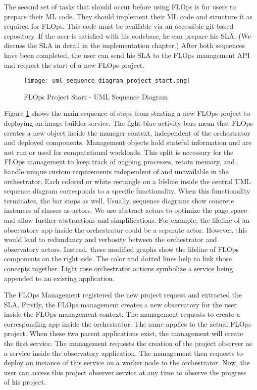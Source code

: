 The second set of tasks that should occur before using FLOps is for users to prepare their ML code.
They should implement their ML code and structure it as required for FLOps.
This code must be available via an accessible git-based repository.
If the user is satisfied with his codebase, he can prepare his SLA.
(We discuss the SLA in detail in the implementation chapter.)
After both sequences have been completed, the user can send his SLA to the FLOps management API and request the start of a new FLOps project.

\begin{figure}[h]
    \begin{adjustwidth}{-0.2\paperwidth}{-0.2\paperwidth}
        \centering
        \texttt{[image: uml\_sequence\_diagram\_project\_start.png]}
        \caption{FLOps Project Start - UML Sequence Diagram}
        \label{fig:uml_sequence_project_start}
    \end{adjustwidth}
\end{figure}

Figure \ref{fig:uml_sequence_project_start} shows the main sequence of steps from starting a new FLOps project to deploying an image builder service.
The light blue activity bars mean that FLOps creates a new object inside the manager context, independent of the orchestrator and deployed components.
Management objects hold stateful information and are not run or used for computational workloads.
This split is necessary for the FLOps management to keep track of ongoing processes, retain memory, and handle unique custom requirements independent of and unavailable in the orchestrator.
Each colored or white rectangle on a lifeline inside the central UML sequence diagram corresponds to a specific functionality.
When this functionality terminates, the bar stops as well.
Usually, sequence diagrams show concrete instances of classes as actors.
We use abstract actors to optimize the page space and allow further abstractions and simplifications.
For example, the lifeline of an observatory app inside the orchestrator could be a separate actor.
However, this would lead to redundancy and verbosity between the orchestrator and observatory actors.
Instead, these modified graphs show the lifeline of FLOps components on the right side.
The color and dotted lines help to link those concepts together.
Light rose orchestrator actions symbolize a service being appended to an existing application.

The FLOps Management registered the new project request and extracted the SLA.
Firstly, the FLOps management creates a new observatory for the user inside the FLOps management context.
The management requests to create a corresponding app inside the orchestrator.
The same applies to the actual FLOps project.
When these two parent applications exist, the management will create the first service.
The management requests the creation of the project observer as a service inside the observatory application.
The management then requests to deploy an instance of this service on a worker node to the orchestrator.
Now, the user can access this project observer service at any time to observe the progress of his project.

